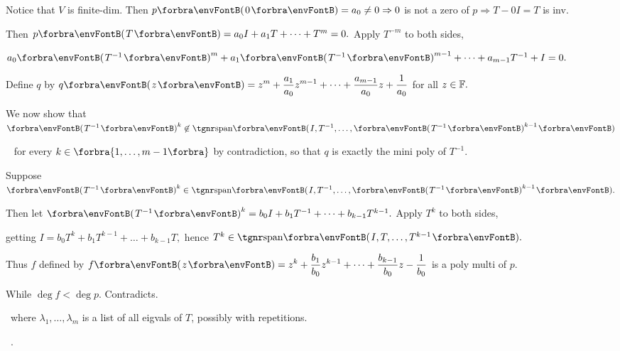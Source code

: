 \documentclass[a4paper, 11pt, UTF8]{article}
\begin{document}
\begin{large}
\par\quad
Notice that $V$ is finite-dim. Then $p\Par{0}=a_0\neq 0\Rightarrow 0$ is not a zero of $p\Rightarrow T-0I=T$ is inv.\par\quad
Then $p\Par{T}=a_0 I+a_1 T+\dots+T^m=0.$ Apply $T^{-m}$ to both sides,\par\quad
$a_0\Par{T^{-1}}^m+a_1\Par{T^{-1}}^{m-1}+\dots+a_{m-1}T^{-1}+I=0.$\par\quad
Define $q$ by $\displaystyle q\Par{z}=z^m+\frac{a_1}{a_0} z^{m-1}+\dots+\frac{a_{m-1}}{a_0}z+\frac{1}{a_0}$ for all $z\in{\mathbb{F}}.$\par\vspace{6pt}\quad
We now show that $\Par{T^{-1}}^k\not\in\Span{I,T^{-1},\dots,\Par{T^{-1}}^{k-1}}$\par\qquad\qquad\qquad\,\,\,
for every $k\in\Bra{1,\dots,m-1}$ by contradiction, so that $q$ is exactly the mini poly of $T^{-1}.$\par\quad
Suppose $\Par{T^{-1}}^k\in\Span{I,T^{-1},\dots,\Par{T^{-1}}^{k-1}}.$\par\quad
Then let $\Par{T^{-1}}^k=b_0 I+b_1 T^{-1}+\dots+b_{k-1}T^{k-1}.$ Apply $T^k$ to both sides,\par\qquad\qquad
 getting $I=b_0 T^k+b_1 T^{k-1}+\dots+b_{k-1}T,$ hence $T^k\in\Span{I,T,\dots,T^{k-1}}.$\par\vspace{6pt}\quad
Thus $f$ defined by $\displaystyle f\Par{z}=z^k+\frac{b_1}{b_0} z^{k-1}+\dots+\frac{b_{k-1}}{b_0} z-\frac{1}{b_0}$ is a poly multi of $p$.\par\quad
While $\deg f<\deg p.$ Contradicts.\PfEnd
\SepLine

\BulletPoint \,\hspace{1pt}\NoteFor{[8.49]}\TextB{}
{\tgsl\large where $\lambda_1,\dots,\lambda_m$ is a list of all eigvals of $T$, {\tgsc possibly with repetitions}.}\par
\BulletPoint \,\hspace{1pt}\Comment\TextB{}
.
\SepLine


\end{large}
\end{document}
